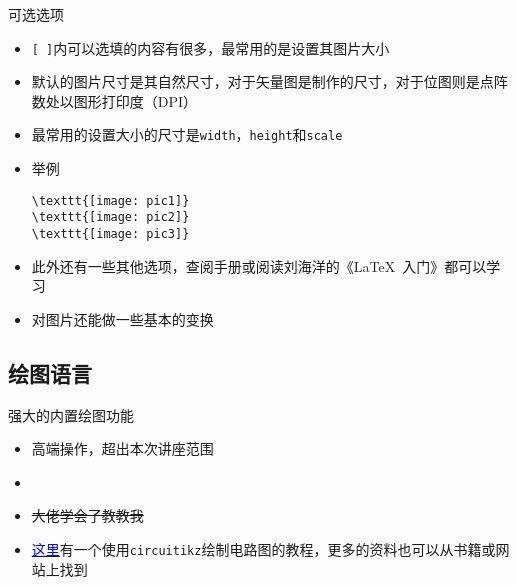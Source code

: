 \begin{frame}[fragile]{可选选项}
	\begin{itemize}
		\item \texttt{[ ]}内可以选填的内容有很多，最常用的是设置其图片大小
		\item 默认的图片尺寸是其自然尺寸，对于矢量图是制作的尺寸，对于位图则是点阵数处以图形打印度（DPI）
		\item 最常用的设置大小的尺寸是\texttt{width}，\texttt{height}和\texttt{scale}
		\item 举例
\begin{lstlisting}
\texttt{[image: pic1]}
\texttt{[image: pic2]}
\texttt{[image: pic3]}
\end{lstlisting}
		\item 此外还有一些其他选项，查阅手册或阅读刘海洋的《LaTeX~入门》都可以学习
		\item 对图片还能做一些基本的变换
	\end{itemize}
\end{frame}

\subsection{绘图语言}
\begin{frame}{强大的内置绘图功能}
	\begin{itemize}
		\item 高端操作，超出本次讲座范围
		\item {}
		\item \sout{大佬学会了教教我}
		\item \href{http://topspeedsnail.com/latex-circuitikz-circuit/}{\textcolor{blue}{这里}}有一个使用\texttt{circuitikz}绘制电路图的教程，更多的资料也可以从书籍或网站上找到
	\end{itemize}
\end{frame}

